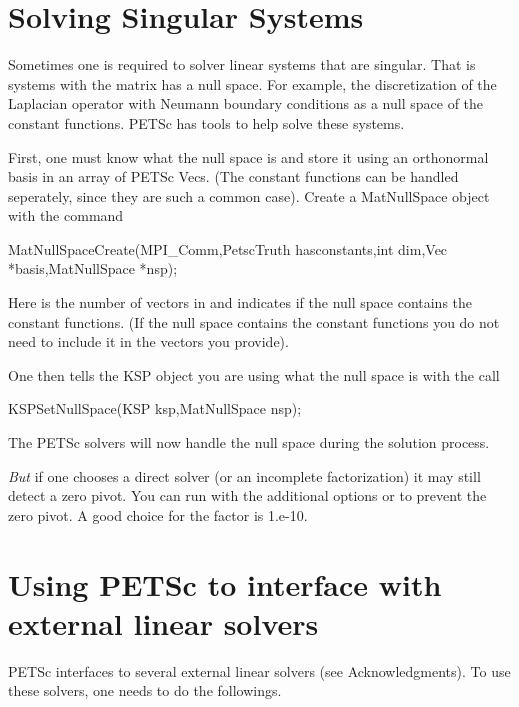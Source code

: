 \section{Solving Singular Systems}
\label{sec_singular}

Sometimes one is required to solver linear systems that are singular. 
That is systems with the matrix has a null space. For example, the 
discretization of the Laplacian operator with Neumann boundary conditions
as a null space of the constant functions. PETSc has tools to help
solve these systems.

First, one must know what the null space is and store it using an orthonormal basis 
in an array of PETSc Vecs. (The constant functions can be handled seperately, since
they are such a common case). Create a MatNullSpace object with the command
\begin{tabbing}
MatNullSpaceCreate(MPI\_Comm,PetscTruth hasconstants,int dim,Vec *basis,MatNullSpace *nsp);
\end{tabbing}
Here  is the number of vectors in  and  indicates
if the null space contains the constant functions. (If the null space contains the constant
functions you do not need to include it in the  vectors you provide).

One then tells the KSP object you are using what the null space is with the call
\begin{tabbing}
KSPSetNullSpace(KSP ksp,MatNullSpace nsp);
\end{tabbing}
The PETSc solvers will now handle the null space during the solution process.

\emph{But} if one chooses a direct solver (or an incomplete factorization)
it may still detect a zero pivot. 
You can run with the additional options  
 or   to 
prevent the zero pivot. A good choice for the  factor is 1.e-10.

\section{Using PETSc to interface with external linear solvers}
\label{sec_externalsol}

PETSc interfaces to several external linear solvers (see Acknowledgments).
To use these solvers, one needs to do the followings.

